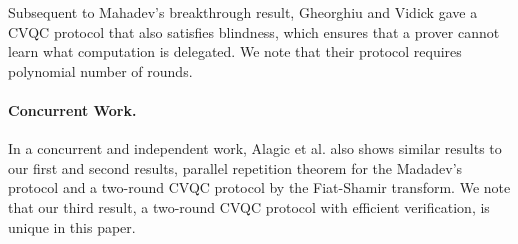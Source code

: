 Subsequent to Mahadev's breakthrough result, Gheorghiu and Vidick \cite{FOCS:GheVid19} gave a CVQC protocol that also satisfies blindness, which ensures that a prover cannot learn what computation is delegated.
We note that their protocol requires polynomial number of rounds.

\paragraph{Concurrent Work.}
In a concurrent and independent work, Alagic et al. \cite{arXiv:AlaChiHun19} also shows similar results to our first and second results, parallel repetition theorem for the Madadev's protocol and a two-round CVQC protocol by the Fiat-Shamir transform.
We note that our third result, a two-round CVQC protocol with efficient verification, is unique in this paper.   








